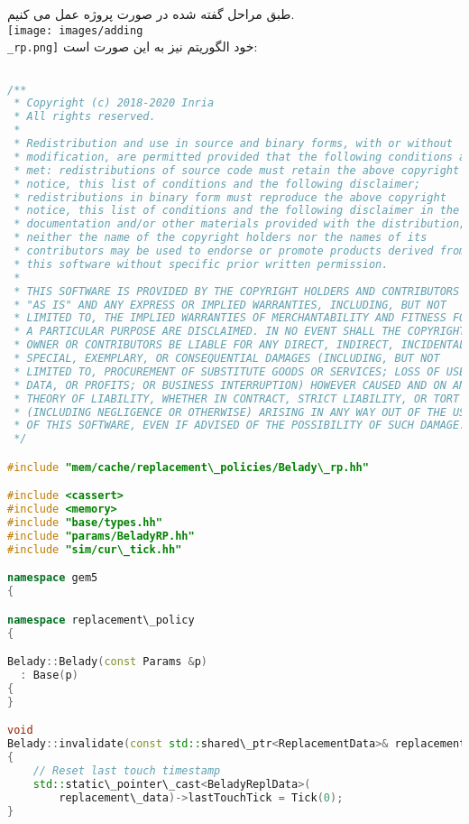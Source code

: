 طبق مراحل گفته شده در صورت پروژه عمل می کنیم.
\\
\texttt{[image: images/adding\\\_rp.png]}
خود الگوریتم نیز به این صورت است:
\\
\begin{latin}
\begin{lstlisting}[language=C++, caption=Algorithm implementation]

/**
 * Copyright (c) 2018-2020 Inria
 * All rights reserved.
 *
 * Redistribution and use in source and binary forms, with or without
 * modification, are permitted provided that the following conditions are
 * met: redistributions of source code must retain the above copyright
 * notice, this list of conditions and the following disclaimer;
 * redistributions in binary form must reproduce the above copyright
 * notice, this list of conditions and the following disclaimer in the
 * documentation and/or other materials provided with the distribution;
 * neither the name of the copyright holders nor the names of its
 * contributors may be used to endorse or promote products derived from
 * this software without specific prior written permission.
 *
 * THIS SOFTWARE IS PROVIDED BY THE COPYRIGHT HOLDERS AND CONTRIBUTORS
 * "AS IS" AND ANY EXPRESS OR IMPLIED WARRANTIES, INCLUDING, BUT NOT
 * LIMITED TO, THE IMPLIED WARRANTIES OF MERCHANTABILITY AND FITNESS FOR
 * A PARTICULAR PURPOSE ARE DISCLAIMED. IN NO EVENT SHALL THE COPYRIGHT
 * OWNER OR CONTRIBUTORS BE LIABLE FOR ANY DIRECT, INDIRECT, INCIDENTAL,
 * SPECIAL, EXEMPLARY, OR CONSEQUENTIAL DAMAGES (INCLUDING, BUT NOT
 * LIMITED TO, PROCUREMENT OF SUBSTITUTE GOODS OR SERVICES; LOSS OF USE,
 * DATA, OR PROFITS; OR BUSINESS INTERRUPTION) HOWEVER CAUSED AND ON ANY
 * THEORY OF LIABILITY, WHETHER IN CONTRACT, STRICT LIABILITY, OR TORT
 * (INCLUDING NEGLIGENCE OR OTHERWISE) ARISING IN ANY WAY OUT OF THE USE
 * OF THIS SOFTWARE, EVEN IF ADVISED OF THE POSSIBILITY OF SUCH DAMAGE.
 */

#include "mem/cache/replacement\_policies/Belady\_rp.hh"

#include <cassert>
#include <memory>
#include "base/types.hh"
#include "params/BeladyRP.hh"
#include "sim/cur\_tick.hh"

namespace gem5
{

namespace replacement\_policy
{

Belady::Belady(const Params &p)
  : Base(p)
{
}

void
Belady::invalidate(const std::shared\_ptr<ReplacementData>& replacement\_data)
{
    // Reset last touch timestamp
    std::static\_pointer\_cast<BeladyReplData>(
        replacement\_data)->lastTouchTick = Tick(0);
}


\end{lstlisting}
\end{latin}
